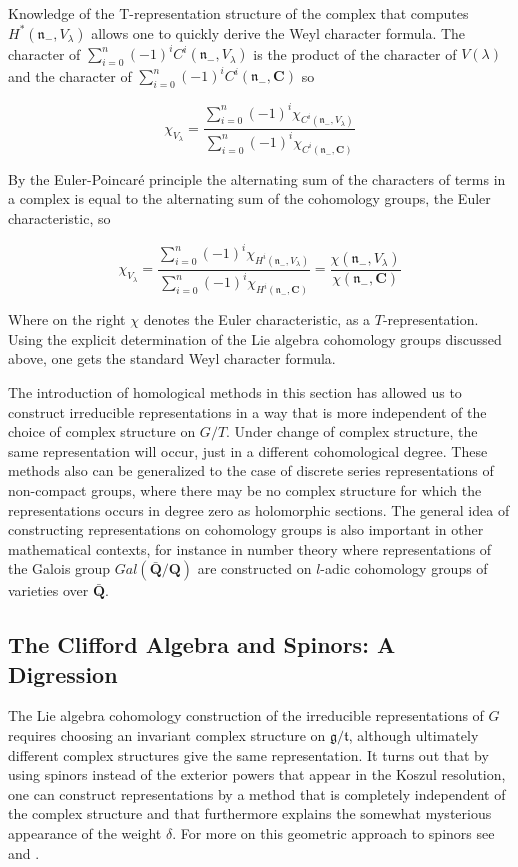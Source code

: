 \documentclass[a4paper,a4paper]{article}
\theoremstyle{conjecture}
\begin{document}
Knowledge of the T-representation structure of the complex that computes $H^*(\mathfrak
n_-,V_\lambda)$ allows one to quickly derive the Weyl character formula.  The character
of $\sum_{i=0}^n(-1)^iC^i(\mathfrak n_-,V_\lambda)$ is the product of the character of
$V(\lambda)$ and the character of $\sum_{i=0}^n(-1)^iC^i(\mathfrak n_-,\mathbf C)$ so

$$\chi_{V_\lambda}=\frac{\sum_{i=0}^n(-1)^i \chi_{C^i(\mathfrak n_-,V_\lambda)}}
{\sum_{i=0}^n(-1)^i \chi_{C^i(\mathfrak n_-,\mathbf C)}}$$

By the Euler-Poincar\'e principle the alternating sum of the characters of terms
in a complex is equal to the alternating sum of the cohomology groups, the Euler
characteristic, so

$$\chi_{V_\lambda}=\frac{\sum_{i=0}^n(-1)^i \chi_{H^i(\mathfrak n_-,V_\lambda)}}
{\sum_{i=0}^n(-1)^i \chi_{H^i(\mathfrak n_-,\mathbf C)}}=\frac{\chi({\mathfrak n}_-,V_\lambda)}
{\chi({\mathfrak n}_-,\mathbf C)}$$

Where on the right $\chi$ denotes the Euler characteristic, as a $T$-representation.  Using
the explicit determination of the Lie algebra cohomology groups discussed above, one gets
the standard Weyl character formula.

The introduction of homological methods in this section has allowed us to construct irreducible
representations in a way that is more independent of the choice of complex structure on
$G/T$.  Under change of complex structure, the same representation will occur, just in
a different cohomological degree.  These methods also can be generalized to the case of
discrete series representations of non-compact groups, where there may be no complex structure for
which the representations
occurs in degree zero as holomorphic sections.  The general idea of constructing representations
on cohomology groups is also important in other mathematical contexts, for instance in number
theory where representations of the Galois group $Gal({\mathbf {\bar Q}}/{\mathbf Q})$ are constructed
on $l$-adic cohomology groups of varieties over ${\mathbf {\bar Q}}$.


\subsection{The Clifford Algebra and Spinors: A Digression}

The Lie algebra cohomology construction of the irreducible
representations of $G$ requires choosing an invariant complex
structure on $\mathfrak g/\mathfrak t$, although ultimately
different complex structures give the same representation. It
turns out that by using spinors instead of the exterior powers
that appear in the Koszul resolution, one can construct
representations by a method that is completely independent of the
complex structure and that furthermore explains the somewhat
mysterious appearance of the weight $\delta$. For more on this 
geometric approach to spinors see \cite{Chevalley} and
\cite{PS}.
\end{document}
